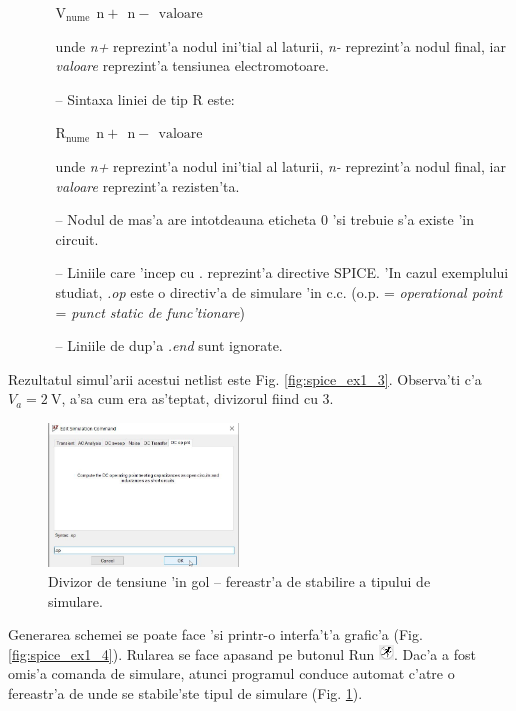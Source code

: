 \begin{enumerate}
\begin{itemize}
$\mathrm{V_{nume}~~n+~~n-~~valoare}$

unde \textit{n+} reprezint'a nodul ini'tial al laturii, \textit{n-} reprezint'a nodul final, iar \textit{valoare} reprezint'a tensiunea electromotoare.
\item[--] Sintaxa liniei de tip R este:

$\mathrm{R_{nume}~~n+~~n-~~valoare}$

unde \textit{n+} reprezint'a nodul ini'tial al laturii, \textit{n-} reprezint'a nodul final, iar \textit{valoare} reprezint'a rezisten'ta. 
\item[--] Nodul de mas'a are intotdeauna eticheta 0 'si trebuie s'a existe 'in circuit.
\item[--] Liniile care 'incep cu . reprezint'a directive SPICE. 'In cazul exemplului studiat, \textit{.op} este o directiv'a de simulare 'in c.c. (o.p. = \textit{operational point} = \textit{punct static de func'tionare})
\item[--] Liniile de dup'a \textit{.end} sunt ignorate.

\end{itemize}
\end{enumerate}

Rezultatul simul'arii acestui netlist este Fig. \ref{fig:spice_ex1_3}. Observa'ti c'a $V_a = 2~\mathrm{V}$, a'sa cum era as'teptat, divizorul fiind cu 3.

\begin{figure}
	\centering
		\includegraphics[width=0.45\textwidth]{laborator_01/figuri/spice_divizor_comanda_simulare}
	\caption{Divizor de tensiune 'in gol -- fereastr'a de stabilire a tipului de simulare.}
	\label{fig:spice_ex1_5}
\end{figure}

Generarea schemei se poate face 'si printr-o interfa't'a grafic'a (Fig. \ref{fig:spice_ex1_4}). Rularea se face apasand pe butonul Run \includegraphics[width=0.03\textwidth]{laborator_01/figuri/spice_Run_icon}. Dac'a a fost omis'a comanda de simulare, atunci programul conduce automat c'atre o fereastr'a de unde se stabile'ste tipul de simulare (Fig. \ref{fig:spice_ex1_5}).


